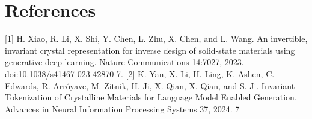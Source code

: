 \documentclass[11pt]{article}
\begin{document}
\section*{References}

[1] H. Xiao, R. Li, X. Shi, Y. Chen, L. Zhu, X. Chen, and L. Wang. An invertible, invariant crystal
representation for inverse design of solid-state materials using generative deep learning. Nature
Communications 14:7027, 2023. doi:10.1038/s41467-023-42870-7.
[2] K. Yan, X. Li, H. Ling, K. Ashen, C. Edwards, R. Arróyave, M. Zitnik, H. Ji, X. Qian, X.
Qian, and S. Ji. Invariant Tokenization of Crystalline Materials for Language Model Enabled
Generation. Advances in Neural Information Processing Systems 37, 2024.
7
\end{document}
